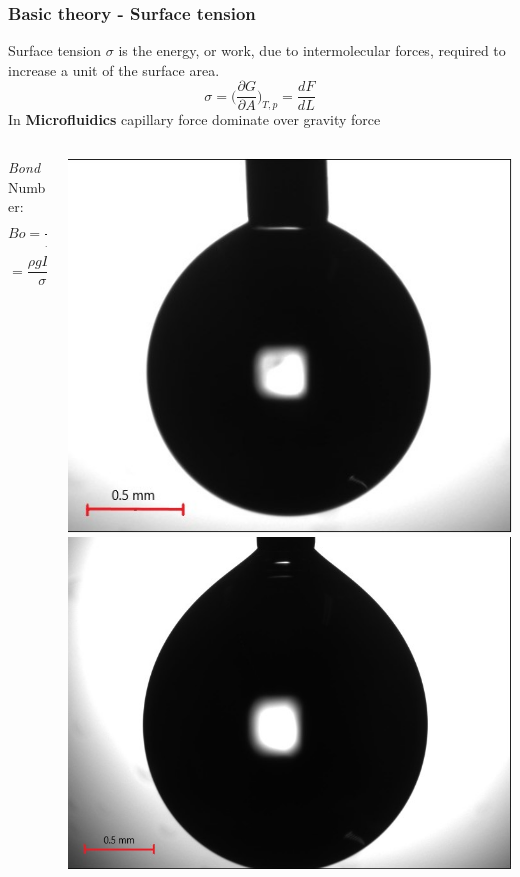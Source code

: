 \documentclass[xcolor=table]{beamer}
\begin{document}
\begin{frame}
\frametitle{Basic theory - Surface tension}
\fontsize{11}{0}
\bigskip
Surface tension $\sigma$ is the energy, or work, due to intermolecular forces, required to increase a unit of the surface area.
\begin{equation}
\sigma=\bigg(\frac{\partial G}{\partial A}\bigg)_{T,p}=\frac{dF}{dL}
\end{equation}
\bigskip
In \textbf{Microfluidics} capillary force dominate over gravity force
\begin{columns}
	\begin{column}{.5\textwidth}
		\centering
		\textit{Bond} Number:
		\begin{equation*}
		Bo=\frac{F_{gravity}}{F_{capillary}}=
		\end{equation*}
		\begin{equation*}
		=\frac{\rho g L^2}{\sigma}<<1.
		\end{equation*}
	\end{column}
	\begin{column}{.7\textwidth}
		\includegraphics[width=.4\columnwidth]{prova_0019A.jpg}
		\includegraphics[width=.4\columnwidth]{prova_0115A.jpg}
	\end{column}
\end{columns}
\end{frame}
\end{document}
